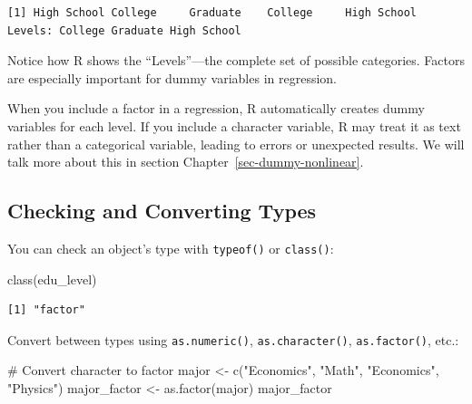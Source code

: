 \documentclass[
  letterpaper,
  DIV=11,
  numbers=noendperiod]{scrreprt}
\newenvironment{Shaded}{\begin{snugshade}}{\end{snugshade}}
\newcommand{\CommentTok}[1]{\textcolor[rgb]{0.37,0.37,0.37}{#1}}
\newcommand{\FunctionTok}[1]{\textcolor[rgb]{0.28,0.35,0.67}{#1}}
\newcommand{\NormalTok}[1]{\textcolor[rgb]{0.00,0.23,0.31}{#1}}
\newcommand{\OtherTok}[1]{\textcolor[rgb]{0.00,0.23,0.31}{#1}}
\newcommand{\StringTok}[1]{\textcolor[rgb]{0.13,0.47,0.30}{#1}}
\begin{document}
\begin{verbatim}
[1] High School College     Graduate    College     High School
Levels: College Graduate High School
\end{verbatim}

Notice how R shows the ``Levels''---the complete set of possible
categories. Factors are especially important for dummy variables in
regression.

\begin{tcolorbox}[enhanced jigsaw, arc=.35mm, bottomrule=.15mm, bottomtitle=1mm, breakable, colback=white, colbacktitle=quarto-callout-important-color!10!white, colframe=quarto-callout-important-color-frame, coltitle=black, left=2mm, leftrule=.75mm, opacityback=0, opacitybacktitle=0.6, rightrule=.15mm, title=\textcolor{quarto-callout-important-color}{\faExclamation}\hspace{0.5em}{Why Factors Matter}, titlerule=0mm, toprule=.15mm, toptitle=1mm]

When you include a factor in a regression, R automatically creates dummy
variables for each level. If you include a character variable, R may
treat it as text rather than a categorical variable, leading to errors
or unexpected results. We will talk more about this in section
Chapter~\ref{sec-dummy-nonlinear}.

\end{tcolorbox}

\subsection{Checking and Converting
Types}\label{checking-and-converting-types}

You can check an object's type with \texttt{typeof()} or
\texttt{class()}:

\begin{Shaded}
\begin{Highlighting}[]
\FunctionTok{class}\NormalTok{(edu\_level)}
\end{Highlighting}
\end{Shaded}

\begin{verbatim}
[1] "factor"
\end{verbatim}

Convert between types using \texttt{as.numeric()},
\texttt{as.character()}, \texttt{as.factor()}, etc.:

\begin{Shaded}
\begin{Highlighting}[]
\CommentTok{\# Convert character to factor}
\NormalTok{major }\OtherTok{\textless{}{-}} \FunctionTok{c}\NormalTok{(}\StringTok{"Economics"}\NormalTok{, }\StringTok{"Math"}\NormalTok{, }\StringTok{"Economics"}\NormalTok{, }\StringTok{"Physics"}\NormalTok{)}
\NormalTok{major\_factor }\OtherTok{\textless{}{-}} \FunctionTok{as.factor}\NormalTok{(major)}
\NormalTok{major\_factor}
\end{Highlighting}
\end{Shaded}
\end{document}
